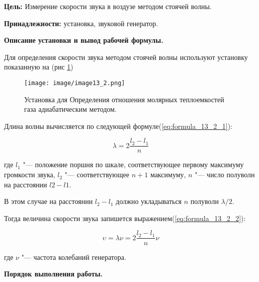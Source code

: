 \textbf{Цель:} Измерение скорости звука в воздузе методом стоячей волны.

\textbf{Принадлежности:} установка, звуковой генератор.

\begin{center}
    \textbf{Описание установки и вывод рабочей формулы.}
\end{center}

Для определения скорости звука методом стоячей волны используют установку показанную на (рис \ref{fig:установка_13_2})

\begin{figure}[!h]
    \centering
    \texttt{[image: image/image13\_2.png]}
    \caption{Установка для Определения отношения молярных теплоемкостей газа адиабатическим методом.}
    \label{fig:установка_13_2}
\end{figure}

Длина волны вычисляется по следующей формуле(\ref{eq:formula_13_2_1}):

\begin{equation}
    \lambda = 2 \frac{l_2 - l_1}{n}
    \label{eq:formula_13_2_1}
\end{equation}

где $l_1$ "--- положение поршня по шкале, соответствующее первому максимуму громкости звука, $l_2$ "--- соответствующее $n+1$ максимуму, $n$ "--- число полуволн на расстоянии $l2-l1$.

В этом случае на расстоянии $l_2 - l_1$ должно укладываться $n$ полуволн  $\lambda / 2$.

Тогда величина скорости звука запишется выражением(\ref{eq:formula_13_2_2}):

\begin{equation}
    \upsilon = \lambda \nu = 2 \frac{l_2 - l_1}{n} \nu
    \label{eq:formula_13_2_2}
\end{equation}

где $\nu$ "--- частота колебаний генератора.

\begin{center}
    \textbf{Порядок выполнения работы.}
\end{center}

